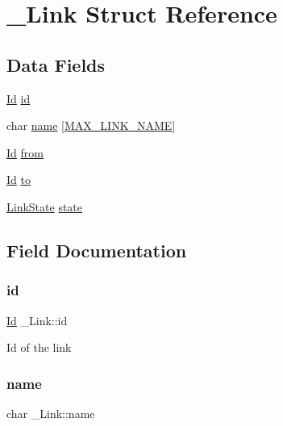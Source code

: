 \hypertarget{struct__Link}{}\section{\+\_\+\+Link Struct Reference}
\label{struct__Link}
\subsection*{Data Fields}
\begin{DoxyCompactItemize}
\item 
\hyperlink{types_8h_a845e604fb28f7e3d97549da3448149d3}{Id} \hyperlink{struct__Link_a151212e7a8e8274c2a1ee991ba95878b}{id}
\item 
char \hyperlink{struct__Link_aab04e4911b02438ad3e38dc142216935}{name} \mbox{[}\hyperlink{link_8h_ab4477e941817afbf1649fdf3dfb62d70}{M\+A\+X\+\_\+\+L\+I\+N\+K\+\_\+\+N\+A\+ME}\mbox{]}
\item 
\hyperlink{types_8h_a845e604fb28f7e3d97549da3448149d3}{Id} \hyperlink{struct__Link_ae33a61999d11b202a1e1af285aaa84b0}{from}
\item 
\hyperlink{types_8h_a845e604fb28f7e3d97549da3448149d3}{Id} \hyperlink{struct__Link_a54563ccd62fdc5057f55fa8f205d928c}{to}
\item 
\hyperlink{link_8h_ab0033b911037fd995258d117e65461e0}{Link\+State} \hyperlink{struct__Link_a58ecee77b2af4dddadb7e8ff94fa0d15}{state}
\end{DoxyCompactItemize}


\subsection{Field Documentation}
\mbox{\label{struct__Link_a151212e7a8e8274c2a1ee991ba95878b}} 
\subsubsection{\texorpdfstring{id}{id}}
{\footnotesize\ttfamily \hyperlink{types_8h_a845e604fb28f7e3d97549da3448149d3}{Id} \+\_\+\+Link\+::id}

Id of the link \mbox{\label{struct__Link_aab04e4911b02438ad3e38dc142216935}} 
\subsubsection{\texorpdfstring{name}{name}}
{\footnotesize\ttfamily char \+\_\+\+Link\+::name}

